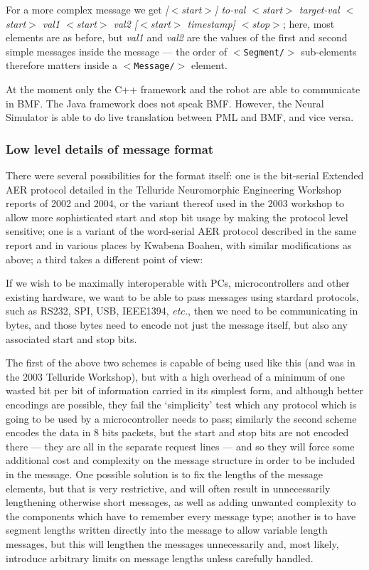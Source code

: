 \documentclass[pdftex,a4paper]{article}
\newcommand{\etc}{{\it etc.}}
\newcommand{\XML}[2][]{{\tt \small $<$#2#1/$>$}}
\begin{document}
For a more complex message we get {\em [$<$start$>$] to-val
$<$start$>$ target-val $<$start$>$ val1 $<$start$>$ val2 [$<$start$>$
timestamp] $<$stop$>$}; here, most elements are as before, but {\em
val1} and {\em val2} are the values of the first and second simple
messages inside the message --- the order of \XML{Segment}
sub-elements therefore matters inside a \XML{Message} element.

At the moment only the C++ framework and the robot are able to communicate in
BMF. The Java framework does not speak BMF. However, the Neural Simulator is
able to do live translation between PML and BMF, and vice versa.

\subsubsection{Low level details of message format}

There were several possibilities for the format itself: one is the
bit-serial Extended AER protocol detailed in the Telluride
Neuromorphic Engineering Workshop reports of 2002 and 2004, or the
variant thereof used in the 2003 workshop to allow more sophisticated
start and stop bit usage by making the protocol level sensitive; one
is a variant of the word-serial AER protocol described in the same
report and in various places by Kwabena Boahen, with similar
modifications as above; a third takes a different point of view:

If we wish to be maximally interoperable with PCs, microcontrollers
and other existing hardware, we want to be able to pass messages using
stardard protocols, such as RS232, SPI, USB, IEEE1394, \etc, then we
need to be communicating in bytes, and those bytes need to encode not
just the message itself, but also any associated start and stop
bits.

The first of the above two schemes is capable of being used like this
(and was in the 2003 Telluride Workshop), but with a high overhead of
a minimum of one wasted bit per bit of information carried in its
simplest form, and although better encodings are possible, they fail
the `simplicity' test which any protocol which is going to be used by
a microcontroller needs to pass; similarly the second scheme encodes
the data in 8 bits packets, but the start and stop bits are not
encoded there --- they are all in the separate request lines --- and
so they will force some additional cost and complexity on the message
structure in order to be included in the message. One possible
solution is to fix the lengths of the message elements, but that is
very restrictive, and will often result in unnecessarily lengthening
otherwise short messages, as well as adding unwanted complexity to the
components which have to remember every message type; another is to
have segment lengths written directly into the message to allow
variable length messages, but this will lengthen the messages
unnecessarily and, most likely, introduce arbitrary limits on message
lengths unless carefully handled.
\end{document}
